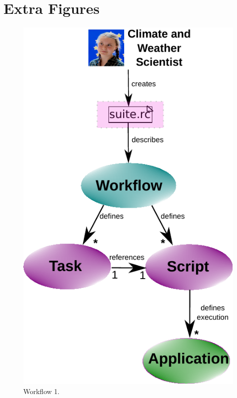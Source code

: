 \documentclass[a4paper]{article}
\begin{document}
\section{Extra Figures}


\begin{figure}[H]
  \centering
  \includegraphics[scale=0.6]{workflow1-v2}
  \caption{Workflow 1.}
  \label{fig:work1}
\end{figure}
\end{document}
